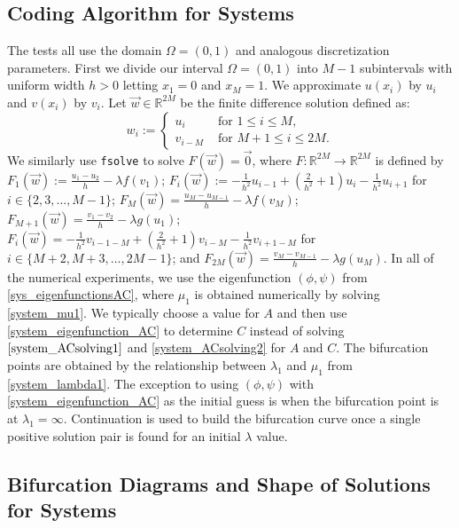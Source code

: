 \documentclass[12pt, reqno]{amsart}
\numberwithin{equation}{section}
\begin{document}

\subsection{Coding Algorithm for Systems}

The tests all use the domain $\Omega = (0,1)$ and analogous discretization parameters.  
First we divide our interval $\Omega = (0,1)$ into $M-1$ subintervals with uniform width $h>0$ letting $x_1 = 0$ and $x_M = 1$. We approximate  $u(x_i)$ by $u_i$ and $v(x_i)$ by $v_i$.  Let $\vec{w} \in \mathbb{R}^{2M}$ be the finite difference solution defined as: 
\[
w_i:=
\begin{cases}
u_i &  \mbox{ for } 1\leq i \leq M,\\
v_{i-M} &  \mbox{ for } M+1 \leq i \leq 2M.
\end{cases}
\]
We similarly use \texttt{fsolve} to solve $F(\vec{w})=\vec{0}$, where $F: \mathbb{R}^{2M}  \to \mathbb{R}^{2M}$ is defined by $F_1(\vec{w}):=\frac{u_1-u_2}{h}-\lambda f (v_1)$; 
$F_i(\vec{w}):=-\frac{1}{h^2}u_{i-1}+(\frac{2}{h^2}+1)u_i-\frac{1}{h^2}u_{i+1}$ for $i \in \{2,3,\ldots , M-1\}$; 
$F_M(\vec{w})=\frac{u_M-u_{M-1}}{h}-\lambda f(v_M)$; 
$F_{M+1}(\vec{w})=\frac{v_1-v_2}{h}-\lambda g (u_1)$;  
$F_i(\vec{w})=-\frac{1}{h^2}v_{i-1-M}+(\frac{2}{h^2}+1)v_{i-M}-\frac{1}{h^2}v_{i+1-M}$ for $i \in \{M+2,M+3,\ldots , 2M-1\}$;  and $F_{2M}(\vec{w})=\frac{v_M-v_{M-1}}{h}-\lambda g(u_M)$.
In all of the numerical experiments, we use the eigenfunction $(\phi, \psi)$ from \eqref{sys_eigenfunctionsAC}, where $\mu_1$ is obtained numerically by solving \eqref{system_mu1}.  
We typically choose a value for $A$ and then use \eqref{system_eigenfunction_AC} to determine $C$ 
instead of solving $\eqref{system_ACsolving1}$ and \eqref{system_ACsolving2} for $A$ and $C$.  
The bifurcation points are obtained by the relationship between $\lambda_1$ and $\mu_1$ from \eqref{system_lambda1}. The exception to using $(\phi, \psi)$ with \eqref{system_eigenfunction_AC} as the initial guess is when the bifurcation point is at $\lambda_1 = \infty$.
Continuation is used to build the bifurcation curve once a single positive solution pair is found for an initial $\lambda$ value.



\subsection{Bifurcation Diagrams and Shape of Solutions for Systems}
\end{document}
